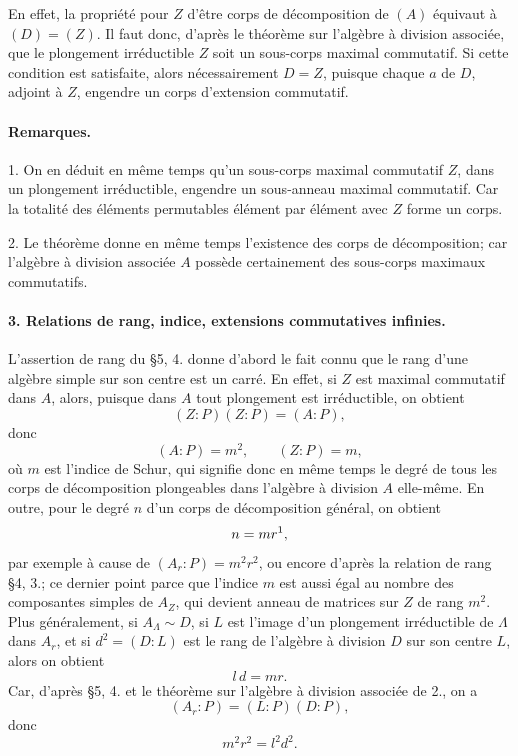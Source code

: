 En effet, la propriété pour \(Z\) d'être corps de décomposition de \((A)\) équivaut à \((D)=(Z)\). Il faut donc, d'après le théorème sur l'algèbre à division associée, que le plongement irréductible \(Z\) soit un sous-corps maximal commutatif. Si cette condition est satisfaite, alors nécessairement \(D=Z\), puisque chaque \(a\) de \(D\), adjoint à \(Z\), engendre un corps d'extension commutatif.

\paragraph{Remarques.}
1. On en déduit en même temps qu'un sous-corps maximal commutatif \(Z\), dans un plongement irréductible, engendre un sous-anneau maximal commutatif. Car la totalité des éléments permutables élément par élément avec \(Z\) forme un corps.

2. Le théorème donne en même temps l'existence des corps de décomposition; car l'algèbre à division associée \(A\) possède certainement des sous-corps maximaux commutatifs.

\paragraph{3. Relations de rang, indice, extensions commutatives infinies.}
L'assertion de rang du \S 5, 4. donne d'abord le fait connu que le rang d'une algèbre simple sur son centre est un carré. En effet, si \(Z\) est maximal commutatif dans \(A\), alors, puisque dans \(A\) tout plongement est irréductible, on obtient
\[
        (Z:P)(Z:P)=(A:P),
\]
donc
\[
        (A:P)=m^2,\qquad (Z:P)=m,
\]
où \(m\) est l'indice de Schur, qui signifie donc en même temps le degré de tous les corps de décomposition plongeables dans l'algèbre à division \(A\) elle-même. En outre, pour le degré \(n\) d'un corps de décomposition général, on obtient
\[
        n=mr\text{\footnotemark},
\]
par exemple à cause de \((A_r:P)=m^2r^2\), ou encore d'après la relation de rang \S 4, 3.; ce dernier point parce que l'indice \(m\) est aussi égal au nombre des composantes simples de \(A_Z\), qui devient anneau de matrices sur \(Z\) de rang \(m^2\). Plus généralement, si \(A_\Lambda\sim D\), si \(L\) est l'image d'un plongement irréductible de \(\Lambda\) dans \(A_r\), et si \(d^2=(D:L)\) est le rang de l'algèbre à division \(D\) sur son centre \(L\), alors on obtient
\[
        l\,d=mr .
\]
Car, d'après \S 5, 4. et le théorème sur l'algèbre à division associée de 2., on a
\[
        (A_r:P)=(L:P)(D:P),
\]
donc
\[
        m^2r^2=l^2d^2 .
\]

